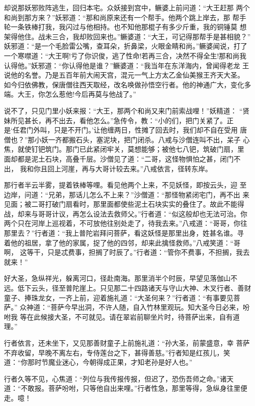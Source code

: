 却说那妖邪败阵逃生，回归本宅。众妖接到宫中，鳜婆上前问道：“大王赶那
两个和尚到那方来？”妖邪道：“那和尚原来还有一个帮手。他两个跳上岸去，那
帮手轮一条铁棒打我，我闪过与他相持。也不知他那棍子有多少斤重，我的铜锤莫
想架得他住。战未三合，我却败回来也。”鳜婆道：“大王，可记得那帮手是甚相貌？”
妖邪道：“是一个毛脸雷公嘴，查耳朵，折鼻梁，火眼金睛和尚。”鳜婆闻说，打了
一个寒噤道：“大王啊!亏了你识俊，逃了性命!若再三合，决然不得全生!那和尚我
认得他。”妖邪道：“你认得他是谁？”鳜婆道：“我当年在东洋海内，曾闻得老龙
王说他的名誉。乃是五百年前大闹天宫，混元一气上方太乙金仙美猴王齐天大圣。
如今归依佛教，保唐僧往西天取经，改名唤做孙悟空行者。他的神通广大，变化多
端。大王，你怎么惹他!今后再莫与他战了。”

说不了，只见门里小妖来报：“大王，那两个和尚又来门前索战哩！”妖精道：
“贤妹所见甚长，再不出去，看他怎么。”急传令，教：“小的们，把门关紧了。正
是‘任君门外叫，只是不开门。’让他缠两日，性摊了回去时，我们却不自在受用
唐僧也？”那小妖一齐都搬石头，塞泥块，把门闭杀。八戒与沙僧连叫不出，呆子
心焦，就使钉钯筑门。那门已此紧闭牢关，莫想能够；被他七八钯，筑破门扇，里
面却都是泥土石块，高叠千层。沙僧见了道：“二哥，这怪物惧怕之甚，闭门不出，
我和你且回上河崖，再与大哥计较去来。”八戒依言，径转东岸。

那行者半云半雾，提着铁棒等哩。看见他两个上来，不见妖怪，即按云头，迎
至边岸，问道：“兄弟，那话儿怎么不上来？”沙僧道：“那怪物紧闭宅门，再不出
来见面；被二哥打破门扇看时，那里面都使些泥土石块实实的叠住了。故此不能得
战，却来与哥哥计议，再怎么设法去救师父。”行者道：“似这般却也无法可治。你
两个只在河岸上巡视着，不可放他往别处走了，待我去来。”八戒道：“哥哥，你往
那里去？”行者道：“我上普陀岩拜问菩萨，看这妖怪是那里出身，姓甚名谁。寻
着他的祖居，拿了他的家属，捉了他的四邻，却来此擒怪救师。”八戒笑道：“哥啊，
这等干，只是忒费事，担搁了时辰了。”行者道：“管你不费事，不担搁，我去就来！”

好大圣，急纵祥光，躲离河口，径赴南海。那里消半个时辰，早望见落伽山不
远。低下云头，径至普陀崖上。只见那二十四路诸天与守山大神、木叉行者、善财
童子、捧珠龙女，一齐上前，迎着施礼道：“大圣何来？”行者道：“有事要见菩萨。”
众神道：“菩萨今早出洞，不许人随，自入竹林里观玩。知大圣今日必来，吩咐我
等在此候接大圣，不可就见。请在翠岩前聊坐片时，待菩萨出来，自有道理。”

行者依言，还未坐下，又见那善财童子上前施礼道：“孙大圣，前蒙盛意，幸
菩萨不弃收留，早晚不离左右，专侍莲台之下，甚得善慈。”行者知是红孩儿，笑
道：“你那时节魔业迷心，今朝得成正果，才知老孙是好人也。”

行者久等不见，心焦道：“列位与我传报传报，但迟了，恐伤吾师之命。”诸天
道：“不敢报。菩萨吩咐，只等他自出来哩。”行者性急，那里等得，急纵身往里便
走。噫！

